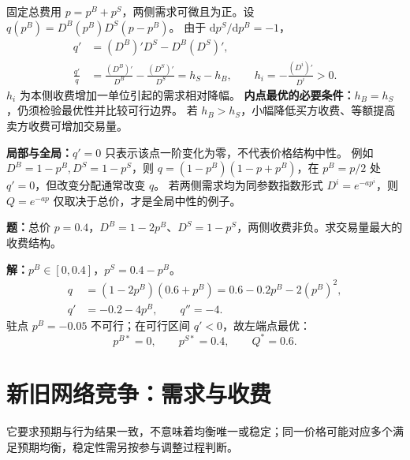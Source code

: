 \documentclass[12pt,a4paper,fontset=none]{ctexart}
\begin{document}
\begin{proofbox}[title=推导]
固定总费用 $p=p^B+p^S$，两侧需求可微且为正。设 $q(p^B)=D^B(p^B)D^S(p-p^B)$。
由于 $\mathrm dp^S/\mathrm dp^B=-1$，
\begin{align*}
q'&=(D^B)'D^S-D^B(D^S)',\\
\frac{q'}q&=\frac{(D^B)'}{D^B}-\frac{(D^S)'}{D^S}
=h_S-h_B,\qquad h_i=-\frac{(D^i)'}{D^i}>0.
\end{align*}
$h_i$ 为本侧收费增加一单位引起的需求相对降幅。
\textbf{内点最优的必要条件：}$h_B=h_S$，仍须检验最优性并比较可行边界。
若 $h_B>h_S$，小幅降低买方收费、等额提高卖方收费可增加交易量。
\end{proofbox}
\textbf{局部与全局：}$q'=0$ 只表示该点一阶变化为零，不代表价格结构中性。
例如 $D^B=1-p^B,D^S=1-p^S$，则 $q=(1-p^B)(1-p+p^B)$，在 $p^B=p/2$ 处 $q'=0$，但改变分配通常改变 $q$。
若两侧需求均为同参数指数形式 $D^i=e^{-ap^i}$，则 $Q=e^{-ap}$ 仅取决于总价，才是全局中性的例子。

\begin{examplebox}[title=例题]
\textbf{题：}总价 $p=0.4$，$D^B=1-2p^B$、$D^S=1-p^S$，两侧收费非负。求交易量最大的收费结构。

\textbf{解：}$p^B\in[0,0.4]$，$p^S=0.4-p^B$。
\begin{align*}
q&=(1-2p^B)(0.6+p^B)=0.6-0.2p^B-2(p^B)^2,\\
q'&=-0.2-4p^B,\qquad q''=-4.
\end{align*}
驻点 $p^B=-0.05$ 不可行；在可行区间 $q'<0$，故左端点最优：
\[
\boxed{p^{B*}=0,\qquad p^{S*}=0.4,\qquad Q^*=0.6.}
\]
\end{examplebox}

\section{新旧网络竞争：需求与收费}

它要求预期与行为结果一致，不意味着均衡唯一或稳定；同一价格可能对应多个满足预期均衡，稳定性需另按参与调整过程判断。
\end{document}
